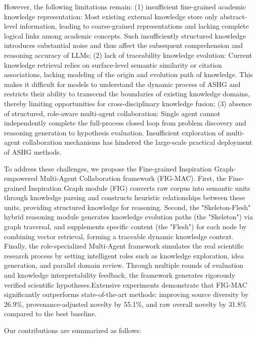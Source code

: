 \documentclass[runningheads]{llncs}
\begin{document}
However, the following limitations remain: (1) insufficient fine-grained academic knowledge representation: Most existing external knowledge store only abstract-level information,  leading to coarse-grained representations and lacking complete logical links among academic concepts. Such insufficiently structured knowledge introduces substantial noise and thus affect the subsequent comprehension and reasoning accuracy of LLMs; (2) lack of traceability knowledge evolution: Current knowledge retrieval relies on surface-level semantic similarity or citation associations, lacking modeling of the origin and evolution path of knowledge. This makes it difficult for models to understand the dynamic process of ASHG and restricts their ability to transcend the boundaries of existing knowledge domains, thereby limiting opportunities for cross-disciplinary knowledge fusion; (3) absence of structured, role-aware multi-agent collaboration: Single agent cannot independently complete the full-process closed loop from problem discovery and reasoning generation to hypothesis evaluation. Insufficient exploration of multi-agent collaboration mechanisms has hindered the large-scale practical deployment of ASHG methods.

To address these challenges, we propose the Fine-grained Inspiration Graph-empowered Multi-Agent Collaboration framework (FIG-MAC). First, the Fine-grained Inspiration Graph module (FIG) converts raw corpus into semantic units through knowledge parsing and constructs heuristic relationships between these units, providing structured knowledge for reasoning. Second, the "Skeleton-Flesh" hybrid reasoning module generates knowledge evolution paths (the "Skeleton") via graph traversal, and supplements specific content (the "Flesh") for each node by combining vector retrieval, forming a traceable dynamic knowledge context. Finally, the role-specialized Multi-Agent framework simulates the real scientific research process by setting intelligent roles such as knowledge exploration, idea generation, and parallel domain review. Through multiple rounds of evaluation and knowledge interpretability feedback, the framework generates rigorously verified scientific hypotheses.Extensive experiments demonstrate that FIG-MAC significantly outperforms state-of-the-art methods: improving source diversity by 26.9\%, provenance-adjusted novelty by 55.1\%, and raw overall novelty by 31.8\% compared to the best baseline.

Our contributions are summarized as follows:
\end{document}
